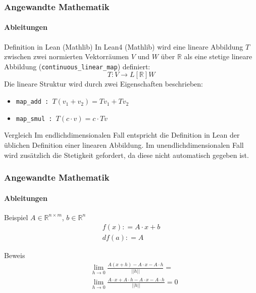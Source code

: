 \documentclass{beamer}
\begin{document}
    \begin{frame}
        \frametitle{Angewandte Mathematik}
        \framesubtitle{Ableitungen}
  
        \begin{block}{Definition in Lean (Mathlib)}
            In Lean4 (Mathlib) wird eine lineare Abbildung \( T \) zwischen zwei normierten Vektorräumen \( V \) und \( W \) über \( \mathbb{R} \) als eine stetige lineare Abbildung (\texttt{continuous\_linear\_map}) definiert:
            \[
            T : V \to L[\mathbb{R}] W
            \]
            Die lineare Struktur wird durch zwei Eigenschaften beschrieben:
            \begin{itemize}
                \item \texttt{map\_add : $T (v_1 + v_2) = T v_1 + T v_2$}
                \item \texttt{map\_smul : $T (c \cdot v) = c \cdot T v$}
            \end{itemize}
        \end{block}
    
        \begin{block}{Vergleich}
           Im endlichdimensionalen Fall entspricht die Definition in Lean der üblichen Definition einer linearen Abbildung. 
           Im unendlichdimensionalen Fall wird zusätzlich die Stetigkeit gefordert, da diese nicht automatisch gegeben ist.
        \end{block}
        
    \end{frame}


    \begin{frame}
        \frametitle{Angewandte Mathematik}
        \framesubtitle{Ableitungen}
        \begin{block}{Beispiel}
    $A \in \mathbb{R}^{n \times m}$, $b \in \mathbb{R}^n$ 
    \begin{align}
    f(x) : = A\cdot x + b \\
    df(a) : = A 
    \end{align}
    \end{block}
        \begin{block}{Beweis}
    \begin{align}
    & \lim_{h\to 0} \frac{A(x + h) - A\cdot x -A\cdot h}{||h||} = \\
    & \lim_{h\to 0} \frac{A\cdot x + A \cdot h - A\cdot x -A\cdot h}{||h||} = 0
    \end{align}
    \end{block}
    
     \end{frame}
    
\end{document}
